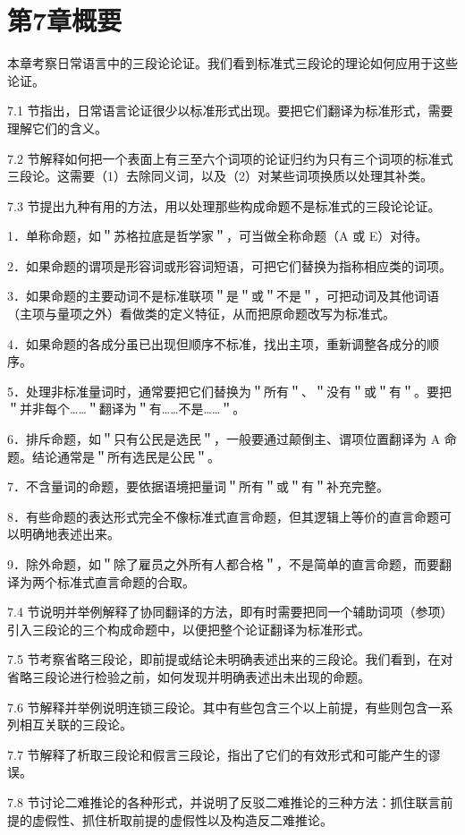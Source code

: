 \section*{第7章概要}
本章考察日常语言中的三段论论证。我们看到标准式三段论的理论如何应用于这些论证。

7.1 节指出，日常语言论证很少以标准形式出现。要把它们翻译为标准形式，需要理解它们的含义。

7.2 节解释如何把一个表面上有三至六个词项的论证归约为只有三个词项的标准式三段论。这需要（1）去除同义词，以及（2）对某些词项换质以处理其补类。

7.3 节提出九种有用的方法，用以处理那些构成命题不是标准式的三段论论证。

1．单称命题，如＂苏格拉底是哲学家＂，可当做全称命题（A 或 E）对待。

2．如果命题的谓项是形容词或形容词短语，可把它们替换为指称相应类的词项。

3．如果命题的主要动词不是标准联项＂是＂或＂不是＂，可把动词及其他词语（主项与量项之外）看做类的定义特征，从而把原命题改写为标准式。

4．如果命题的各成分虽已出现但顺序不标准，找出主项，重新调整各成分的顺序。

5．处理非标准量词时，通常要把它们替换为＂所有＂、＂没有＂或＂有＂。要把＂并非每个……＂翻译为＂有……不是……＂。

6．排斥命题，如＂只有公民是选民＂，一般要通过颠倒主、谓项位置翻译为 A 命题。结论通常是＂所有选民是公民＂。

7．不含量词的命题，要依据语境把量词＂所有＂或＂有＂补充完整。

8．有些命题的表达形式完全不像标准式直言命题，但其逻辑上等价的直言命题可以明确地表述出来。

9．除外命题，如＂除了雇员之外所有人都合格＂，不是简单的直言命题，而要翻译为两个标准式直言命题的合取。

7.4 节说明并举例解释了协同翻译的方法，即有时需要把同一个辅助词项（参项）引入三段论的三个构成命题中，以便把整个论证翻译为标准形式。

7.5 节考察省略三段论，即前提或结论未明确表述出来的三段论。我们看到，在对省略三段论进行检验之前，如何发现并明确表述出未出现的命题。

7.6 节解释并举例说明连锁三段论。其中有些包含三个以上前提，有些则包含一系列相互关联的三段论。

7.7 节解释了析取三段论和假言三段论，指出了它们的有效形式和可能产生的谬误。

7.8 节讨论二难推论的各种形式，并说明了反驳二难推论的三种方法：抓住联言前提的虚假性、抓住析取前提的虚假性以及构造反二难推论。 